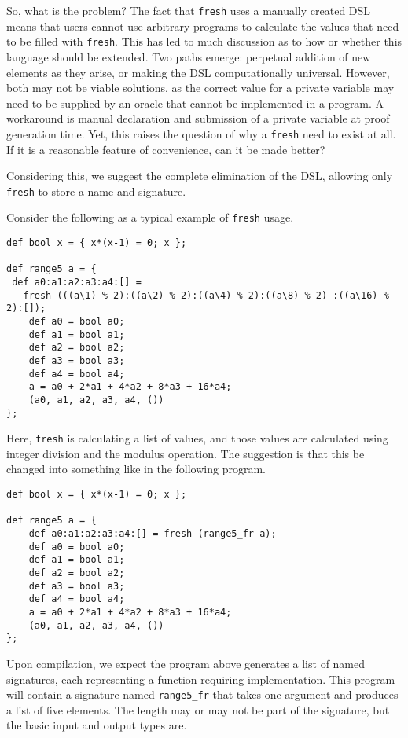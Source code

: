 \documentclass[
    9pt,            
    techreport,       
    affiltop,       
]{art}
\begin{document}
So, what is the problem? The fact that \texttt{fresh} uses a manually created DSL means that users cannot use arbitrary programs to calculate the values that need to be filled with \texttt{fresh}. This has led to much discussion as to how or whether this language should be extended. Two paths emerge: perpetual addition of new elements as they arise, or making the DSL computationally universal. However, both may not be viable solutions, as the correct value for a private variable may need to be supplied by an oracle that cannot be implemented in a \VampIR{} program.  A workaround is manual declaration and submission of a private variable at proof generation time. Yet, this raises the question of why a \texttt{fresh} need to exist at all. If it is a reasonable feature of convenience, can it be made better?

Considering this, we suggest the complete elimination of the DSL, allowing only
\texttt{fresh} to store a name and signature. 

\begin{example}\label{example:1}
Consider the following as a
typical example of \texttt{fresh} usage.

\begin{verbatim}
def bool x = { x*(x-1) = 0; x };

def range5 a = {
 def a0:a1:a2:a3:a4:[] =
   fresh (((a\1) % 2):((a\2) % 2):((a\4) % 2):((a\8) % 2) :((a\16) % 2):[]);
    def a0 = bool a0;
    def a1 = bool a1;
    def a2 = bool a2;
    def a3 = bool a3;
    def a4 = bool a4;
    a = a0 + 2*a1 + 4*a2 + 8*a3 + 16*a4;
    (a0, a1, a2, a3, a4, ())
};
\end{verbatim}

Here, \texttt{fresh} is calculating a list of values, and those values are calculated using integer division and the modulus operation. The suggestion is that this be changed into something like in the following program.

\begin{verbatim}
def bool x = { x*(x-1) = 0; x };

def range5 a = {
    def a0:a1:a2:a3:a4:[] = fresh (range5_fr a);
    def a0 = bool a0;
    def a1 = bool a1;
    def a2 = bool a2;
    def a3 = bool a3;
    def a4 = bool a4;
    a = a0 + 2*a1 + 4*a2 + 8*a3 + 16*a4;
    (a0, a1, a2, a3, a4, ())
};
\end{verbatim}

Upon compilation, we expect the program above generates a list of named signatures, each representing a function requiring implementation. This program will contain a signature named \texttt{range5\_fr} that takes one argument and produces a list of five elements. The length may or may not be part of the signature, but the basic input and output types are. 
\end{example}
\end{document}
